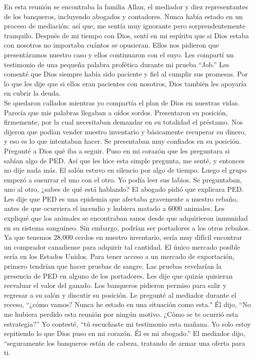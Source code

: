 \documentclass[twoside, 12pt]{book}
\begin{document}
En esta reunión se encontraba la familia Allan, el mediador y diez representantes de los banqueros, incluyendo abogados y contadores. Nunca había estado en un proceso de mediación: así que, me sentía muy ignorante pero sorprendentemente tranquilo. Después de mi tiempo con Dios, sentí en mi espíritu que si Dios estaba con nosotros no importaba cuántos se opusieran. Ellos nos pidieron que presentáramos nuestro caso y ellos continuaron con el suyo. Les compartí un testimonio de una pequeña palabra profética durante mi prueba “Job.” Les comenté que Dios siempre había sido paciente y fiel al cumplir sus promesas. Por lo que les dije que si ellos eran pacientes con nosotros, Dios también les apoyaría en cubrir la deuda.\\

Se quedaron callados mientras yo compartía el plan de Dios en nuestras vidas. Parecía que mis palabras llegaban a oídos sordos. Presentaron su posición, firmemente, por la cual necesitaban demandar en su totalidad el préstamo. Nos dijeron que podían vender nuestro inventario y básicamente recuperar su dinero, y eso es lo que intentaban hacer. Se presentaban muy confiados en su posición. Pregunté a Dios qué iba a seguir. Puso en mi corazón que les preguntara si sabían algo de PED. Así que les hice esta simple pregunta, me senté, y entonces no dije nada más. El salón estuvo en silencio por algo de tiempo. Luego el grupo empezó a susurrar el uno con el otro. Yo podía leer sus labios. Se preguntaban, uno al otro, ¿sabes de qué está hablando? El abogado pidió que explicara PED. Les dije que PED es una epidemia que afectaba gravemente a nuestro rebaño, antes de que ocurriera el incendio y hubiera matado a 6000 animales. Les expliqué que los animales se encontraban sanos desde que adquirieron inmunidad en su sistema sanguíneo. Sin embargo, podrían ser portadores a los otros rebaños. Ya que tenemos 28,000 cerdos en nuestro inventario, sería muy difícil encontrar un comprador canadiense para adquirir tal cantidad. El único mercado posible sería en los Estados Unidos. Para tener acceso a un mercado de exportación, primero tendrían que hacer pruebas de sangre. Las pruebas revelarían la presencia de PED en alguno de los portadores. Les dije que quizás quisieran reevaluar el valor del ganado. Los banqueros pidieron permiso para salir y regresar a su salón y discutir su posición. Le pregunté al mediador durante el receso, “¿cómo vamos? Nunca he estado en una situación como esta." Él dijo, “No me hubiera perdido esta reunión por ningún motivo. ¿Cómo se te ocurrió esta estrategia?” Yo contesté, “tú escuchaste mi testimonio esta mañana. Yo solo estoy repitiendo lo que Dios puso en mi corazón. Él es mi abogado.” El mediador dijo, “seguramente los banqueros están de cabeza, tratando de armar una oferta para ti.\\
\end{document}
